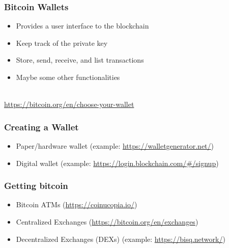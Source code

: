 \documentclass{beamer}
\begin{document}
\begin{frame}
  \frametitle{Bitcoin Wallets}
  \begin{itemize}
  	\item Provides a user interface to the blockchain
	\item Keep track of the private key
	\item Store, send, receive, and list transactions
	\item Maybe some other  functionalities

  \end{itemize}
  $ $ \\ 
  \pause
  \url{https://bitcoin.org/en/choose-your-wallet}
\end{frame}

\begin{frame}
  \frametitle{Creating a Wallet}
  
	\begin{itemize}
		\item Paper/hardware  wallet (example: \url{https://walletgenerator.net/})
		\item Digital wallet (example: \url{https://login.blockchain.com/\#/signup})
	\end{itemize}
\end{frame}
\begin{frame}
  \frametitle{Getting bitcoin}
  	\begin{itemize}
  		\item Bitcoin ATMs (\url{https://coinucopia.io/}) \pause
  		\item Centralized Exchanges (\url{https://bitcoin.org/en/exchanges}) \pause
  		\item Decentralized Exchanges (DEXs) (example: \url{https://bisq.network/})
  	\end{itemize}
\end{frame}
\end{document}
